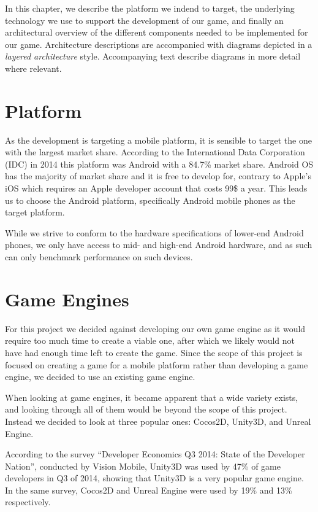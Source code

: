 In this chapter, we describe the platform we indend to target, the underlying
technology we use to support the development of our game, and finally an
architectural overview of the different components needed to be implemented for
our game. Architecture descriptions are accompanied with diagrams depicted in a
\textit{layered architecture} style. Accompanying text describe diagrams in
more detail where relevant.

\section{Platform} 
As the development is targeting a mobile platform, it is sensible to target the one with the largest market share.
According to the International Data Corporation (IDC) in 2014 this platform was Android with a 84.7\% market share\cite{marketshare}.
Android OS has the majority of market share and it is free to develop
for, contrary to Apple's iOS which requires an Apple developer account that
costs 99\$ a year\cite{appledevprogram}.
This leads us to choose the Android platform, specifically Android mobile
phones as the target platform.

While we strive to conform to the hardware specifications of lower-end Android
phones, we only have access to mid- and high-end Android hardware, and as such
can only benchmark performance on such devices.

\section{Game Engines}
For this project we decided against developing our own game engine as it would require too much time to create a viable one, after which we likely would not have had enough time left to create the game. 
Since the scope of this project is focused on creating a game for a mobile platform rather than developing a game engine, we decided to use an existing game engine.

When looking at game engines, it became apparent that a wide variety exists, and looking through all of them would be beyond the scope of this project.
Instead we decided to look at three popular ones: Cocos2D, Unity3D, and Unreal Engine.

According to the survey ``Developer Economics Q3 2014: State of the Developer Nation''\cite{visionmobile-survey}, conducted by Vision Mobile\cite{visionmobile}, Unity3D was used by 47\% of game developers in Q3 of 2014, showing that Unity3D is a very popular game engine. 
In the same survey, Cocos2D and Unreal Engine were used by 19\% and 13\% respectively.

